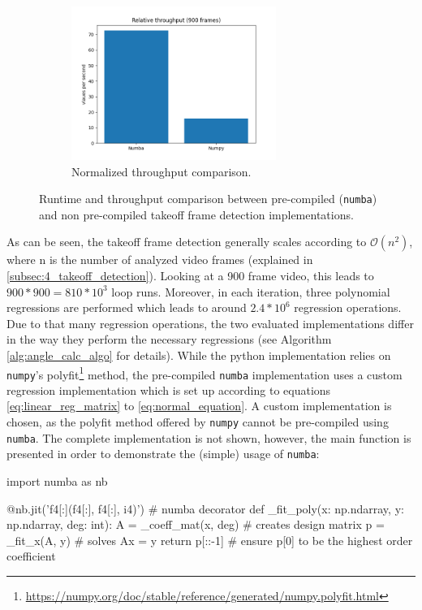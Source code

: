 \begin{figure}[!h]
\begin{subfigure}[b]{0.48\textwidth}
    \end{subfigure}
    \hfill
    \begin{subfigure}[b]{0.48\textwidth}
        \includegraphics*[height=5cm]{relative_throughput_900.png} 
        \caption{Normalized throughput comparison.\\}
    \end{subfigure}
    \caption[Takeoff frame detection performance]{Runtime and throughput
    comparison between pre-compiled (\texttt{numba}) and non
    pre-compiled takeoff frame detection implementations.}
    \label{fig:takeoff_frame_detection_performance}
\end{figure}
\FloatBarrier
\noindent As can be seen, the takeoff frame detection generally scales
according to $\mathcal{O}(n^2)$, where n is the number of analyzed video
frames (explained in \autoref{subsec:4_takeoff_detection}).
Looking at a 900 frame video, this leads to $900 * 900 = 810*10^3$ loop runs.
Moreover, in each iteration, three polynomial regressions are performed which
leads to around $2.4*10^6$ regression operations.\\
Due to that many regression operations, the two evaluated implementations
differ in the way they perform the necessary regressions (see Algorithm
\ref{alg:angle_calc_algo} for details).
While the python implementation relies on \texttt{numpy}'s
polyfit\footnote{\url{https://numpy.org/doc/stable/reference/generated/numpy.polyfit.html}}
method, the pre-compiled \texttt{numba} implementation uses a custom
regression implementation which is set up according to equations
\ref{eq:linear_reg_matrix} to \ref{eq:normal_equation}.
A custom implementation is chosen, as the polyfit method offered by
\texttt{numpy} cannot be pre-compiled using \texttt{numba}.
The complete implementation is not shown, however, the main function is
presented in order to demonstrate the (simple) usage of \texttt{numba}:\\
\begin{pythoncode}[caption=Polynomial regression,label=alg:poly_fit_numba]
    import numba as nb

    @nb.jit('f4[:](f4[:], f4[:], i4)') # numba decorator
    def _fit_poly(x: np.ndarray, y: np.ndarray, deg: int):
        A = _coeff_mat(x, deg) # creates design matrix
        p = _fit_x(A, y) # solves Ax = y
        return p[::-1] # ensure p[0] to be the highest order coefficient
\end{pythoncode}
